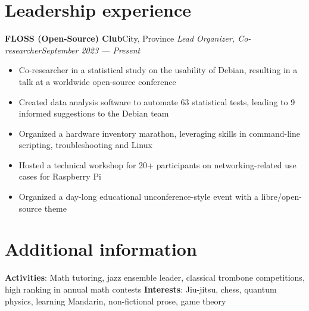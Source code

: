 \documentclass{article}
\newcommand{\newrole}[4]{
    {\normalfont\textbf{#1}\hfill#3}
    \newline
    \textit{#2}\hfill\textit{#4}
}
\newenvironment{bulletpoints}{\begin{itemize}\setlength\itemsep{-0.3em}}{\end{itemize}}
\begin{document}
\section*{Leadership experience}
\newrole{FLOSS (Open-Source) Club}{Lead Organizer, Co-researcher}{City, Province}{September 2023 --- Present}
\begin{bulletpoints}
    \item Co-researcher in a statistical study on the usability of Debian, resulting in a talk at a worldwide open-source conference
    \item Created data analysis software to automate 63 statistical tests, leading to 9 informed suggestions to the Debian team
    \item Organized a hardware inventory marathon, leveraging skills in command-line scripting, troubleshooting and Linux
    \item Hosted a technical workshop for 20+ participants on networking-related use cases for Raspberry Pi
    \item Organized a day-long educational unconference-style event with a libre/open-source theme
\end{bulletpoints}


\section*{Additional information}
{\bfseries Activities}: Math tutoring, jazz ensemble leader, classical trombone competitions, high ranking in annual math contests
\newline
{\bfseries Interests}: Jiu-jitsu, chess, quantum physics, learning Mandarin, non-fictional prose, game theory
\end{document}
